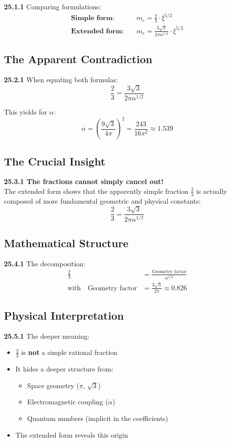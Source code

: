 \documentclass[12pt,a4paper]{article}
\begin{document}
\noindent \textbf{25.1.1} Comparing formulations:
\begin{align*}
	\textbf{Simple form:} &\quad m_e = \frac{2}{3} \cdot \xi^{5/2} \\
	\textbf{Extended form:} &\quad m_e = \frac{3\sqrt{3}}{2\pi\alpha^{1/2}} \cdot \xi^{5/2}
\end{align*}

\subsection{The Apparent Contradiction}

\noindent \textbf{25.2.1} When equating both formulas:
\[
\frac{2}{3} = \frac{3\sqrt{3}}{2\pi\alpha^{1/2}}
\]

This yields for $\alpha$:
\[
\alpha = \left(\frac{9\sqrt{3}}{4\pi}\right)^2 = \frac{243}{16\pi^2} \approx 1.539
\]

\subsection{The Crucial Insight}

\begin{tcolorbox}[colback=red!5!white,colframe=red!75!black]
	\textbf{25.3.1 The fractions cannot simply cancel out!}
	\\
	The extended form shows that the apparently simple fraction $\frac{2}{3}$ is actually composed of more fundamental geometric and physical constants:
	\[
	\frac{2}{3} = \frac{3\sqrt{3}}{2\pi\alpha^{1/2}}
	\]
\end{tcolorbox}

\subsection{Mathematical Structure}

\noindent \textbf{25.4.1} The decomposition:
\begin{align*}
	\frac{2}{3} &= \frac{\text{Geometry factor}}{\alpha^{1/2}} \\
	\text{with} \quad \text{Geometry factor} &= \frac{3\sqrt{3}}{2\pi} \approx 0.826
\end{align*}

\subsection{Physical Interpretation}

\noindent \textbf{25.5.1} The deeper meaning:
\begin{itemize}
	\item $\frac{2}{3}$ is \textbf{not} a simple rational fraction
	\item It hides a deeper structure from:
	\begin{itemize}
		\item Space geometry ($\pi$, $\sqrt{3}$)
		\item Electromagnetic coupling ($\alpha$)
		\item Quantum numbers (implicit in the coefficients)
	\end{itemize}
	\item The extended form reveals this origin
\end{itemize}
\end{document}
